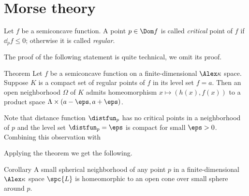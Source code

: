 \section{Morse theory}

Let $f$ be a semiconcave function.
A point $p\in \Dom f$ is called \emph{critical} point of $f$ if $\dd_pf\le 0$; 
otherwise it is called \emph{regular}.

The proof of the following statement is quite technical, we omit its proof.

\begin{thm}{Theorem}
Let $f$ be a semiconcave function on a finite-dimensional $\Alex\kappa$ space.
Suppose $K$ is a compact set of regular points of $f$ in its level set $f=a$.
Then an open neighborhood $\Omega$ of $K$ admits homeomorphism $x\mapsto (h(x),f(x))$ to a product space $\Lambda\times (a-\eps,a+\eps)$.

\end{thm}

Note that distance function $\distfun_p$ has no critical points in a neighborhood of $p$ and the level set $\distfun_p=\eps$ is compact for small $\eps>0$.
Combining this observation with 

Applying the theorem we get the following.

\begin{thm}{Corollary}
A small spherical neighborhood of any point $p$ in a finite-dimensional $\Alex\kappa$ space $\spc{L}$ is homeomorphic to an open cone over small sphere around $p$.
\end{thm}
